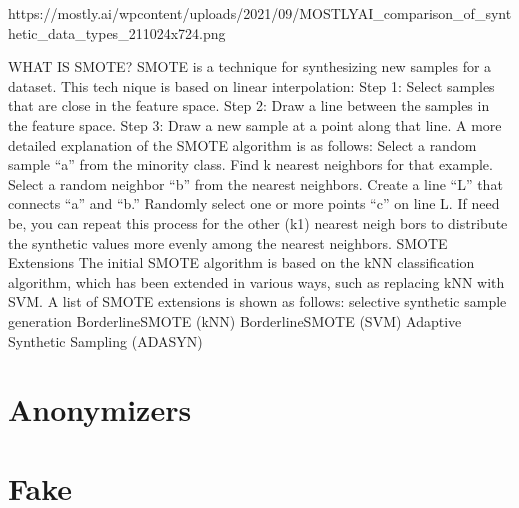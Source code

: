\documentclass[letterpaper,10pt,english]{jupyterBook}
\begin{document}
\sphinxAtStartPar
https://mostly.ai/wp\sphinxhyphen{}content/uploads/2021/09/MOSTLY\sphinxhyphen{}AI\_comparison\_of\_synthetic\_data\_types\_2\sphinxhyphen{}1\sphinxhyphen{}1024x724.png

\sphinxAtStartPar
WHAT IS SMOTE?
SMOTE is a technique for synthesizing new samples for a dataset. This tech\sphinxhyphen{} nique is based on linear interpolation:
Step 1: Select samples that are close in the feature space.
Step 2: Draw a line between the samples in the feature space.
Step 3: Draw a new sample at a point along that line.
A more detailed explanation of the SMOTE algorithm is as follows:
Select a random sample “a” from the minority class.
Find k nearest neighbors for that example.
Select a random neighbor “b” from the nearest neighbors.
Create a line “L” that connects “a” and “b.”
Randomly select one or more points “c” on line L.
If need be, you can repeat this process for the other (k\sphinxhyphen{}1) nearest neigh\sphinxhyphen{} bors to distribute the synthetic values more evenly among the nearest neighbors.
SMOTE Extensions
The initial SMOTE algorithm is based on the kNN classification algorithm, which has been extended in various ways, such as replacing kNN with SVM. A list of SMOTE extensions is shown as follows:
selective synthetic sample generation
Borderline\sphinxhyphen{}SMOTE (kNN)
Borderline\sphinxhyphen{}SMOTE (SVM)
Adaptive Synthetic Sampling (ADASYN)

\sphinxstepscope


\section{Anonymizers}
\label{\detokenize{src/dsforum/fake_synth/ano:anonymizers}}\label{\detokenize{src/dsforum/fake_synth/ano::doc}}
\sphinxAtStartPar
{}

\sphinxstepscope


\section{Fake}
\label{\detokenize{src/dsforum/fake_synth/fake:fake}}\label{\detokenize{src/dsforum/fake_synth/fake::doc}}
\sphinxstepscope
\end{document}
